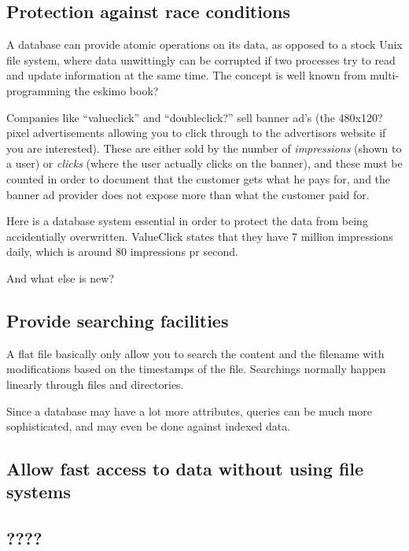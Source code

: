 \documentclass[draft,a4paper]{article}
\begin{document}
\subsection{Protection against race conditions}
\label{sec:protection-against-race-conditions}

A database can provide atomic operations on its data, as opposed to a
stock Unix file system, where data unwittingly can be corrupted if two
processes try to read and update information at the same time.  The
concept is well known from multi-programming \textsf{the eskimo book?}

Companies like ``valueclick'' and ``\textsf{doubleclick?}'' sell
banner ad's (the \textsf{480x120?} pixel advertisements allowing you
to click through to the advertisors website if you are interested).
These are either sold by the number of \textit{impressions} (shown to a
user) or \textit{clicks} (where the user actually clicks on the
banner), and these must be counted in order to document that the
customer gets what he pays for, and the banner ad provider does not
expose more than what the customer paid for.

Here is a database system essential in order to protect the data from
being accidentially overwritten.  ValueClick states that they have
\textsf{7 million impressions}  daily, which is around 80
impressions pr second.

\textsf{And what else is new?}

\subsection{Provide searching facilities}
\label{sec:providing-searching-facilities}

A flat file basically only allow you to search the content and the
filename with modifications based on the timestamps of the file.
Searchings normally happen linearly through files and directories.

Since a database may have a lot more attributes, queries can be much
more sophisticated, and may even be done against indexed data.

\subsection{Allow fast access to data without using file systems}
\label{sec:allow-fast-access-to-data}



\subsection{????}
\end{document}
